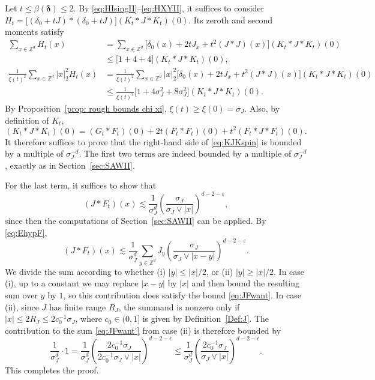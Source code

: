 \documentclass[11pt,a4paper]{article}
\numberwithin{equation}{section}
\theoremstyle{plain}
\theoremstyle{definition}
\newcommand\1{\mathds{1}}
\newcommand{\deltamain}{\boldsymbol{\delta}}
\begin{document}
Let $t\leq \beta(\deltamain)\leq 2$.
By \eqref{eq:HIsingII}--\eqref{eq:HXYII},
it suffices to consider $H_t= \big[ (\delta_0+t J)*(\delta_0+t J) \big] (K_t*J*K_t)(0)$.
Its zeroth and second moments satisfy
\begin{align}
    \sum_{x\in \mathbb Z^d}H_t(x)
    & =\sum_{x\in \mathbb Z^d}\big[ \delta_{0}(x)+2t J_x+ t^2(J*J)(x)  \big]  (K_t*J*K_t)(0)
    \nonumber \\
    & \le
    \big[ 1+4+4    \big]  (K_t*J*K_t)(0),
\\
    \frac{1}{\xi(t)^2}\sum_{x\in \mathbb Z^d}|x|^2_2 H_t(x)
    & =
    \frac{1}{\xi(t)^2}\sum_{x\in \mathbb Z^d}|x|^2_2\big[ \delta_{0}(x)+2t J_x+ t^2(J*J)(x)  \big]  (K_t*J*K_t)(0)
    \nonumber \\
    & \le
    \frac{1}{\xi(t)^2}
    \big[ 1+4\sigma_J^2 + 8\sigma_J^2   \big]  (K_t*J*K_t)(0).
\end{align}
By Proposition~\ref{prop: rough bounds chi xi}, $\xi(t) \ge \xi(0)=\sigma_J$.
Also, by definition of $K_t$,
\begin{equation}
\label{eq:KJKspin}
    (K_t*J*K_t)(0)
    =
    (G_t*F_t)(0) + 2t(F_t*F_t)(0) + t^2 (F_t *J*F_t)(0).
\end{equation}
It therefore suffices to prove that the right-hand side of \eqref{eq:KJKspin} is bounded by a multiple of
$\sigma_J^{-d}$.
The first two terms are indeed bounded by a multiple of
$\sigma_J^{-d}$, exactly as in Section~\ref{sec:SAWII}.

For the last term, it suffices to show that
\begin{equation}
\label{eq:JFwant}
    (J*F_t)(x) \lesssim
    \frac{1}{\sigma_J^d}
    \left(\frac{\sigma_J}{\sigma_J \vee|x|} \right)^{d-2-\varepsilon},
\end{equation}
since then the computations of Section~\ref{sec:SAWII} can be applied.
By \eqref{eq:EhypF},
\begin{equation}\label{eq:JFwant'}
    (J*F_t)(x) \lesssim
    \frac{1}{\sigma_J^d}\sum_{y\in \mathbb Z^d}
    J_y \left(\frac{\sigma_J}{\sigma_J \vee|x-y|} \right)^{d-2-\varepsilon}
    .
\end{equation}
We divide the sum according to whether (i) $|y|\le |x|/2$, or
(ii) $|y|\ge |x|/2$.
In case (i), up to a constant we may replace $|x-y|$ by $|x|$ and then
bound the resulting sum over $y$ by $1$, so this contribution does satisfy the bound \eqref{eq:JFwant}.
In case (ii), since $J$ has finite range $R_J$, the summand is nonzero only if $|x|\le 2R_J \le 2c_0^{-1}\sigma_J$, where $c_0\in (0,1]$ is given by Definition~\ref{Def:J}.
The contribution to the sum \eqref{eq:JFwant'} from case (ii) is therefore bounded by
\begin{equation}
    \frac{1}{\sigma_J^d}\cdot 1
    =
    \frac{1}{\sigma_J^d}
    \left( \frac{ 2c_0^{-1}\sigma_J}{2c_0^{-1}\sigma_J\vee |x|}\right)^{d-2-\epsilon}
    \le
    \frac{1}{\sigma_J^d}
    \left( \frac{ 2c_0^{-1}\sigma_J}{ \sigma_J\vee |x|}\right)^{d-2-\epsilon}.
\end{equation}
This completes the proof.
\end{document}
